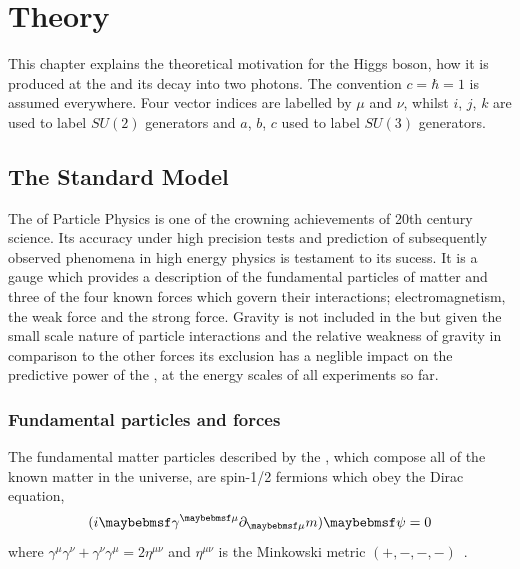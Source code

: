 \chapter{Theory}
\label{chap:theory}

This chapter explains the theoretical motivation for the Higgs boson, how it is produced at the \LHC and its decay into two photons. The convention $c=\hbar=1$ is assumed everywhere. Four vector indices are labelled by $\mu$ and $\nu$, whilst $i$, $j$, $k$ are used to label $SU(2)$ generators and $a$, $b$, $c$ used to label $SU(3)$ generators.

\section{The Standard Model}
\label{sec:standardmodel}

The \SM of Particle Physics is one of the crowning achievements of 20th century science. Its accuracy under high precision tests and prediction of subsequently observed phenomena in high energy physics is testament to its sucess. It is a gauge \QFT which provides a description of the fundamental particles of matter and three of the four known forces which govern their interactions; electromagnetism, the weak force and the strong force. Gravity is not included in the \SM but given the small scale nature of particle interactions and the relative weakness of gravity in comparison to the other forces its exclusion has a neglible impact on the predictive power of the \SM, at the energy scales of all experiments so far. 

\subsection{Fundamental particles and forces}

The fundamental matter particles described by the \SM, which compose all of the known matter in the universe, are spin-1/2 fermions which obey the Dirac equation,
\begin{equation}
  (i\gamma^{\mu}\partial_{\mu}\-m)\psi=0
  \label{eq:dirac}
\end{equation}
where $\gamma^{\mu}\gamma^{\nu}+\gamma^{\nu}\gamma^{\mu}=2\eta^{\mu\nu}$ and $\eta^{\mu\nu}$ is the Minkowski metric $(+,-,-,-)$~\cite{Halzen}.

